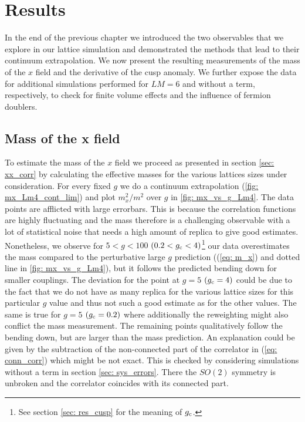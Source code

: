 \chapter{Results}
In the end of the previous chapter we introduced the two observables that we explore in our lattice simulation and demonstrated the methods that lead to their continuum extrapolation. We now present the resulting measurements of the mass of the $x$ field and the derivative of the cusp anomaly. We further expose the data for additional simulations performed for $LM=6$ and without a  term, respectively, to check for finite volume effects and the influence of fermion doublers.
%
%
%
%
%
%
\section[Mass of the x field]{Mass of the x field}
To estimate the mass of the $x$ field we proceed as presented in section \ref{sec: xx_corr} by calculating the effective masses for the various lattices sizes under consideration. For every fixed $g$ we do a continuum extrapolation (\autoref{fig: mx_Lm4_cont_lim}) and plot $m_{x}^{2}/m^{2}$ over $g$ in \autoref{fig: mx_vs_g_Lm4}. The data points are afflicted with large errorbars. This is because the correlation functions are highly fluctuating and the mass therefore is a challenging observable with a lot of statistical noise that needs a high amount of replica to give good estimates. Nonetheless, we observe for $5<g<100$ $(0.2<g_{\rm c}<4)$\footnote{See section \ref{sec: res_cusp} for the meaning of $g_{\rm c}$.} our data overestimates the mass compared to the perturbative large $g$ prediction ((\ref{eq: m_x}) and dotted line in \autoref{fig: mx_vs_g_Lm4}), but it follows the predicted bending down for smaller couplings. The deviation for the point at $g=5$ $(g_{\rm c}=4)$ could be due to the fact that we do not have as many replica for the various lattice sizes for this particular $g$ value and thus not such a good estimate as for the other values. The same is true for $g=5$ $(g_{\rm c}=0.2)$ where additionally the reweighting might also conflict the mass measurement. The remaining points qualitatively follow the bending down, but are larger than the mass prediction. An explanation could be given by the subtraction of the non-connected part of the correlator in (\ref{eq: conn_corr}) which might be not exact. This is checked by considering simulations without a  term in section \ref{sec: sys_errors}. There the $SO(2)$ symmetry is unbroken and the correlator coincides with its connected part. 
